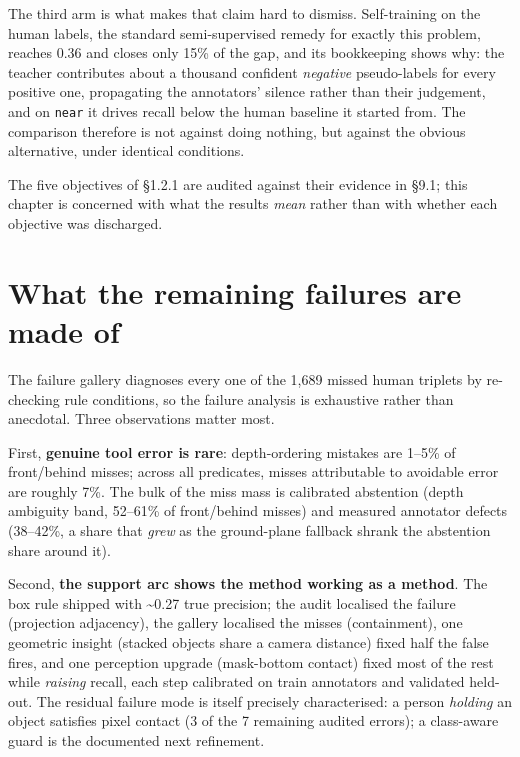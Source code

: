 The third arm is what makes that claim hard to dismiss. Self-training on the human labels, the standard semi-supervised remedy for exactly this problem, reaches 0.36 and closes only 15\% of the gap, and its bookkeeping shows why: the teacher contributes about a thousand confident \textit{negative} pseudo-labels for every positive one, propagating the annotators' silence rather than their judgement, and on \texttt{near} it drives recall below the human baseline it started from. The comparison therefore is not against doing nothing, but against the obvious alternative, under identical conditions.

The five objectives of \S1.2.1 are audited against their evidence in \S9.1; this chapter is concerned with what the results \textit{mean} rather than with whether each objective was discharged.

\section{What the remaining failures are made of}

The failure gallery diagnoses every one of the 1,689 missed human triplets by re-checking rule conditions, so the failure analysis is exhaustive rather than anecdotal. Three observations matter most.

First, \textbf{genuine tool error is rare}: depth-ordering mistakes are 1--5\% of front/behind misses; across all predicates, misses attributable to avoidable error are roughly 7\%. The bulk of the miss mass is calibrated abstention (depth ambiguity band, 52--61\% of front/behind misses) and measured annotator defects (38--42\%, a share that \textit{grew} as the ground-plane fallback shrank the abstention share around it).

Second, \textbf{the support arc shows the method working as a method}. The box rule shipped with \textasciitilde{}0.27 true precision; the audit localised the failure (projection adjacency), the gallery localised the misses (containment), one geometric insight (stacked objects share a camera distance) fixed half the false fires, and one perception upgrade (mask-bottom contact) fixed most of the rest while \textit{raising} recall, each step calibrated on train annotators and validated held-out. The residual failure mode is itself precisely characterised: a person \textit{holding} an object satisfies pixel contact (3 of the 7 remaining audited errors); a class-aware guard is the documented next refinement.

